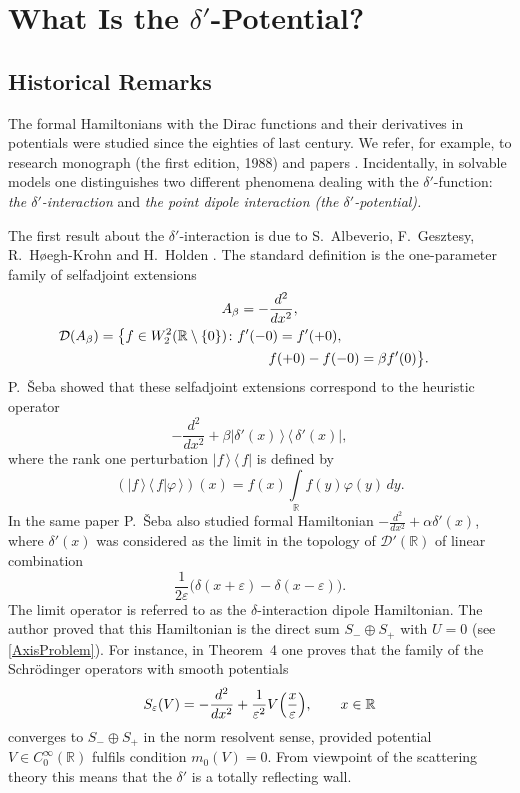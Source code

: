 \documentclass[11pt,english]{amsart}
\begin{document}
\section{What Is the $\delta'$-Potential?}\label{SectionHistory}
\subsection{Historical Remarks}
The formal Hamiltonians with the Dirac functions and their derivatives in potentials were studied since the eighties of last century. We  refer, for example, to  research monograph \cite{Albeverio2edition} (the first edition, 1988) and papers \cite{SebaCzechJPhys86, SebRMP, Grossmann}.
Incidentally, in solvable models one distinguishes  two different phenomena dealing with the $\delta'$-function:
\textit{the $\delta'$-interaction} and  \textit{the point dipole interaction (the $\delta'$-potential).}

The first result about the $\delta'$-interaction is due to S.~Albeverio, F.~Geszte\-sy, R.~H{\o}egh-Krohn and  H.~Holden \cite{Albeverio2edition}.
The standard definition  is the one-parameter family of selfadjoint extensions
\begin{equation}\label{AlbeverioDefn}
\begin{gathered}
A_\beta=-\frac{d^2}{dx^2},\\ \mathcal{D}(A_\beta)=\big\{f\in
W_2^2(\mathbb{R}\setminus\{0\})\colon f'(-0)=f'(+0),\hskip3cm\\\hskip4.5cm
f(+0)-f(-0)=\beta f'(0)\big\}.
\end{gathered}
\end{equation}
P.~\v{S}eba \cite{SebRMP} showed   that these selfadjoint extensions correspond to the heuristic operator
\begin{equation*}
    -\frac{d^2}{dx^2}+\beta|\delta'(x)\,\rangle\,\langle\,\delta'(x)|,
\end{equation*}
where the rank one perturbation $|f\,\rangle\,\langle\,f|$ is defined by
$$
(|f\,\rangle\,\langle\,f|\varphi\,\rangle)(x)=f(x)\int\limits_\mathbb R
f(y)\varphi(y)\,dy.
$$
In the same paper  P.~\v{S}eba  also studied  formal Hamiltonian
$-\frac{d^2}{dx^2}+\alpha\delta'(x)$, where  $\delta'(x)$ was considered as the limit in the topology of  $\mathcal{D}'(\mathbb R)$ of  linear combination
$$
\frac{1}{2\varepsilon}\bigr(\delta(x+\varepsilon)-\delta(x-\varepsilon)\bigl).
$$
The limit operator is referred to as  the $\delta$-interaction dipole Hamiltonian.
The author proved that this Hamiltonian is the direct sum $S_-\oplus S_+$ with $U=0$ (see \eqref{AxisProblem}).
For instance, in Theorem~4 one proves that the family of the  Schr\"{o}dinger operators
with smooth potentials
\begin{equation}\label{SebaOperators}
    S_\varepsilon(V)= -\frac{d^2}{dx^2}+\frac{1}
    {\varepsilon^2}V\Bigl(\frac{x}{\varepsilon}\Bigr),\qquad x\in\mathbb R
\end{equation}
converges to $S_-\oplus S_+$ in the norm resolvent sense, provided potential $V\in C^\infty_0(\mathbb
R)$ fulfils condition  $m_0(V)=0$. From viewpoint of the scattering theory this means that the  $\delta'$ is a totally reflecting wall.
\end{document}
